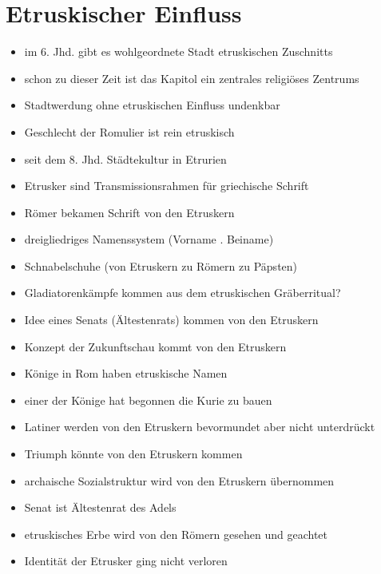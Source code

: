 \documentclass[10pt,a4paper,oneside,ngerman,numbers=noenddot]{scrartcl}
\newenvironment{myitemize}{\begin{itemize}\itemsep -9pt}{\end{itemize}} %
\begin{document}
\section*{Etruskischer Einfluss}
\begin{myitemize}
    \item im 6. Jhd. gibt es wohlgeordnete Stadt etruskischen Zuschnitts
    \item schon zu dieser Zeit ist das Kapitol ein zentrales religiöses Zentrums
    \item Stadtwerdung ohne etruskischen Einfluss undenkbar
    \item Geschlecht der Romulier ist rein etruskisch
    \item seit dem 8. Jhd. Städtekultur in Etrurien
    \item Etrusker sind Transmissionsrahmen für griechische Schrift
    \item Römer bekamen Schrift von den Etruskern
    \item dreigliedriges Namenssystem (Vorname . Beiname)
    \item Schnabelschuhe (von Etruskern zu Römern zu Päpsten)
    \item Gladiatorenkämpfe kommen aus dem etruskischen Gräberritual?
    \item Idee eines Senats (Ältestenrats) kommen von den Etruskern
    \item Konzept der Zukunftschau kommt von den Etruskern
    \item Könige in Rom haben etruskische Namen
    \item einer der Könige hat begonnen die Kurie zu bauen
    \item Latiner werden von den Etruskern bevormundet aber nicht unterdrückt
    \item Triumph könnte von den Etruskern kommen
    \item archaische Sozialstruktur wird von den Etruskern übernommen
    \item Senat ist Ältestenrat des Adels
    \item etruskisches Erbe wird von den Römern gesehen und geachtet
    \item Identität der Etrusker ging nicht verloren
\end{myitemize}
\end{document}
